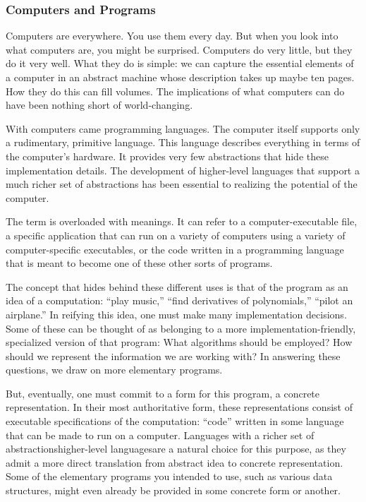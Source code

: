 \label{introduction:introduction}
\subsubsection*{Computers and Programs}
Computers are everywhere. You use them every day. But when you look into what computers are, you might be surprised. Computers do very little, but they do it very well. What they do is simple: we can capture the essential elements of a computer in an abstract machine whose description takes up maybe ten pages. How they do this can fill volumes. The implications of what computers can do have been nothing short of world-changing.

With computers came programming languages. The computer itself supports only a rudimentary, primitive language. This language describes everything in terms of the computer's hardware. It provides very few abstractions that hide these implementation details. The development of higher-level languages that support a much richer set of abstractions has been essential to realizing the potential of the computer.

The term  is overloaded with meanings. It can refer to a computer-executable file, a specific application that can run on a variety of computers using a variety of computer-specific executables, or the code written in a programming language that is meant to become one of these other sorts of programs.

The concept that hides behind these different uses is that of the program as an idea of a computation: ``play music,'' ``find derivatives of polynomials,'' ``pilot an airplane.'' In reifying this idea, one must make many implementation decisions. Some of these can be thought of as belonging to a more implementation-friendly, specialized version of that program: What algorithms should be employed? How should we represent the information we are working with? In answering these questions, we draw on more elementary programs.

But, eventually, one must commit to a form for this program, a concrete representation. In their most authoritative form, these representations consist of executable specifications of the computation: ``code'' written in some language that can be made to run on a computer. Languages with a richer set of abstractions\empause higher-level languages\empause are a natural choice for this purpose, as they admit a more direct translation from abstract idea to concrete representation. Some of the elementary programs you intended to use, such as various data structures, might even already be provided in some concrete form or another.

